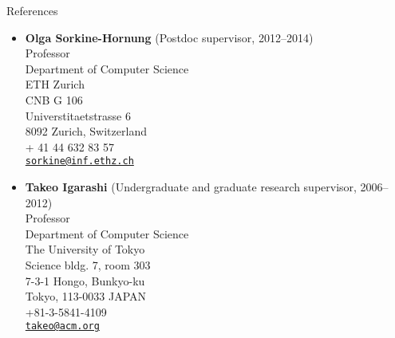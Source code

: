 {\Large\sc References}
\vspace{-3mm}
\begin{itemize}

\item {\bf Olga Sorkine-Hornung} (Postdoc supervisor, 2012--2014) \\
Professor\\
Department of Computer Science\\
ETH Zurich\\
CNB G 106\\
Universtitaetstrasse 6\\
8092 Zurich, Switzerland\\
+ 41 44 632 83 57\\
\href{mailto:sorkine@inf.ethz.ch}{{\tt sorkine@inf.ethz.ch}}

\item {\bf Takeo Igarashi} (Undergraduate and graduate research supervisor, 2006--2012) \\
Professor\\
Department of Computer Science\\
The University of Tokyo\\
Science bldg. 7, room 303\\
7-3-1 Hongo, Bunkyo-ku\\
Tokyo, 113-0033 JAPAN\\
+81-3-5841-4109\\
\href{mailto:takeo@acm.org}{{\tt takeo@acm.org}}

\end{itemize}
